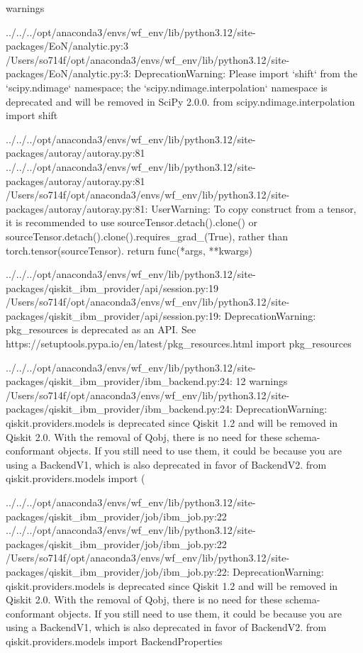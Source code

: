 warnings

../../../opt/anaconda3/envs/wf_env/lib/python3.12/site-packages/EoN/analytic.py:3
  /Users/so714f/opt/anaconda3/envs/wf_env/lib/python3.12/site-packages/EoN/analytic.py:3: DeprecationWarning: Please import `shift` from the `scipy.ndimage` namespace; the `scipy.ndimage.interpolation` namespace is deprecated and will be removed in SciPy 2.0.0.
    from scipy.ndimage.interpolation import shift

../../../opt/anaconda3/envs/wf_env/lib/python3.12/site-packages/autoray/autoray.py:81
../../../opt/anaconda3/envs/wf_env/lib/python3.12/site-packages/autoray/autoray.py:81
  /Users/so714f/opt/anaconda3/envs/wf_env/lib/python3.12/site-packages/autoray/autoray.py:81: UserWarning: To copy construct from a tensor, it is recommended to use sourceTensor.detach().clone() or sourceTensor.detach().clone().requires_grad_(True), rather than torch.tensor(sourceTensor).
    return func(*args, **kwargs)

../../../opt/anaconda3/envs/wf_env/lib/python3.12/site-packages/qiskit_ibm_provider/api/session.py:19
  /Users/so714f/opt/anaconda3/envs/wf_env/lib/python3.12/site-packages/qiskit_ibm_provider/api/session.py:19: DeprecationWarning: pkg_resources is deprecated as an API. See https://setuptools.pypa.io/en/latest/pkg_resources.html
    import pkg_resources

../../../opt/anaconda3/envs/wf_env/lib/python3.12/site-packages/qiskit_ibm_provider/ibm_backend.py:24: 12 warnings
  /Users/so714f/opt/anaconda3/envs/wf_env/lib/python3.12/site-packages/qiskit_ibm_provider/ibm_backend.py:24: DeprecationWarning: qiskit.providers.models is deprecated since Qiskit 1.2 and will be removed in Qiskit 2.0. With the removal of Qobj, there is no need for these schema-conformant objects. If you still need to use them, it could be because you are using a BackendV1, which is also deprecated in favor of BackendV2.
    from qiskit.providers.models import (

../../../opt/anaconda3/envs/wf_env/lib/python3.12/site-packages/qiskit_ibm_provider/job/ibm_job.py:22
../../../opt/anaconda3/envs/wf_env/lib/python3.12/site-packages/qiskit_ibm_provider/job/ibm_job.py:22
  /Users/so714f/opt/anaconda3/envs/wf_env/lib/python3.12/site-packages/qiskit_ibm_provider/job/ibm_job.py:22: DeprecationWarning: qiskit.providers.models is deprecated since Qiskit 1.2 and will be removed in Qiskit 2.0. With the removal of Qobj, there is no need for these schema-conformant objects. If you still need to use them, it could be because you are using a BackendV1, which is also deprecated in favor of BackendV2.
    from qiskit.providers.models import BackendProperties

